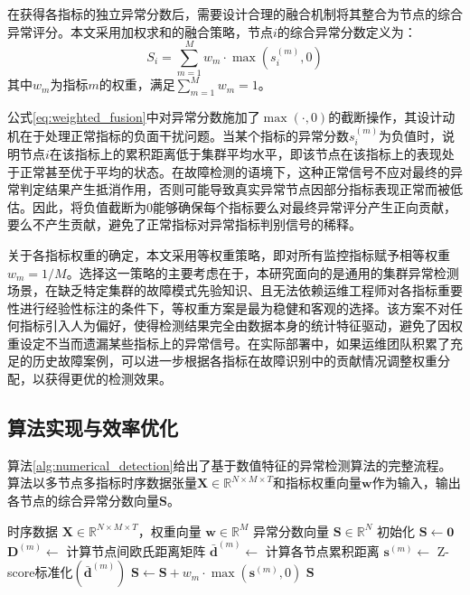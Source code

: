 在获得各指标的独立异常分数后，需要设计合理的融合机制将其整合为节点的综合异常评分。本文采用加权求和的融合策略，节点$i$的综合异常分数定义为：
\begin{equation}
    S_i = \sum_{m=1}^{M} w_m \cdot \max(s_i^{(m)}, 0)
    \label{eq:weighted_fusion}
\end{equation}
其中$w_m$为指标$m$的权重，满足$\sum_{m=1}^{M} w_m = 1$。

公式\ref{eq:weighted_fusion}中对异常分数施加了$\max(\cdot, 0)$的截断操作，其设计动机在于处理正常指标的负面干扰问题。当某个指标的异常分数$s_i^{(m)}$为负值时，说明节点$i$在该指标上的累积距离低于集群平均水平，即该节点在该指标上的表现处于正常甚至优于平均的状态。在故障检测的语境下，这种正常信号不应对最终的异常判定结果产生抵消作用，否则可能导致真实异常节点因部分指标表现正常而被低估。因此，将负值截断为0能够确保每个指标要么对最终异常评分产生正向贡献，要么不产生贡献，避免了正常指标对异常指标判别信号的稀释。

关于各指标权重的确定，本文采用等权重策略，即对所有监控指标赋予相等权重$w_m = 1/M$。选择这一策略的主要考虑在于，本研究面向的是通用的集群异常检测场景，在缺乏特定集群的故障模式先验知识、且无法依赖运维工程师对各指标重要性进行经验性标注的条件下，等权重方案是最为稳健和客观的选择。该方案不对任何指标引入人为偏好，使得检测结果完全由数据本身的统计特征驱动，避免了因权重设定不当而遗漏某些指标上的异常信号。在实际部署中，如果运维团队积累了充足的历史故障案例，可以进一步根据各指标在故障识别中的贡献情况调整权重分配，以获得更优的检测效果。

\subsection{算法实现与效率优化}

算法\ref{alg:numerical_detection}给出了基于数值特征的异常检测算法的完整流程。算法以多节点多指标时序数据张量$\mathbf{X} \in \mathbb{R}^{N \times M \times T}$和指标权重向量$\mathbf{w}$作为输入，输出各节点的综合异常分数向量$\mathbf{S}$。

\begin{algorithm}[htbp]
    \label{alg:numerical_detection}
    \begin{algorithmic}[1]
        \Require 时序数据 $\mathbf{X} \in \mathbb{R}^{N \times M \times T}$，权重向量 $\mathbf{w} \in \mathbb{R}^M$
        \Ensure 异常分数向量 $\mathbf{S} \in \mathbb{R}^N$
        \State 初始化 $\mathbf{S} \gets \mathbf{0}$
         
            \State $\mathbf{D}^{(m)} \gets$ 计算节点间欧氏距离矩阵 
            \State $\bar{\mathbf{d}}^{(m)} \gets$ 计算各节点累积距离 
            \State $\mathbf{s}^{(m)} \gets$ Z-score标准化$(\bar{\mathbf{d}}^{(m)})$ 
            \State $\mathbf{S} \gets \mathbf{S} + w_m \cdot \max(\mathbf{s}^{(m)}, 0)$ 
        \EndFor
        \State \Return $\mathbf{S}$
    \end{algorithmic}
\end{algorithm}

